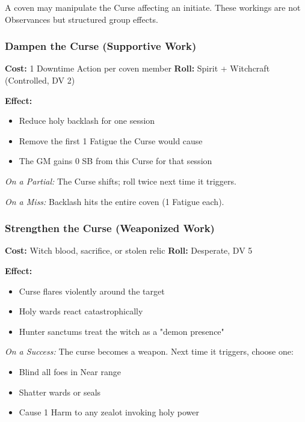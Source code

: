 \documentclass[11pt]{book}
\begin{document}
\begin{tcolorbox}[colback=shadowpurple!5,colframe=shadowpurple!80!black,
title={\textbf{Coven Workings and the Curse of the Unanointed}}]

A coven may manipulate the Curse affecting an initiate.  
These workings are not Observances but structured group effects.

\subsubsection*{Dampen the Curse (Supportive Work)}
\textbf{Cost:} 1 Downtime Action per coven member  
\textbf{Roll:} Spirit + Witchcraft (Controlled, DV 2)

\textbf{Effect:}
\begin{itemize}[leftmargin=1.5em]
    \item Reduce holy backlash for one session
    \item Remove the first 1 Fatigue the Curse would cause
    \item The GM gains 0 SB from this Curse for that session
\end{itemize}

\emph{On a Partial:}  
The Curse shifts; roll twice next time it triggers.

\emph{On a Miss:}  
Backlash hits the entire coven (1 Fatigue each).

\vspace{1em}

\subsubsection*{Strengthen the Curse (Weaponized Work)}
\textbf{Cost:} Witch blood, sacrifice, or stolen relic  
\textbf{Roll:} Desperate, DV 5

\textbf{Effect:}
\begin{itemize}[leftmargin=1.5em]
    \item Curse flares violently around the target
    \item Holy wards react catastrophically
    \item Hunter sanctums treat the witch as a "demon presence"
\end{itemize}

\emph{On a Success:}  
The curse becomes a weapon. Next time it triggers, choose one:
\begin{itemize}
    \item Blind all foes in Near range  
    \item Shatter wards or seals  
    \item Cause 1 Harm to any zealot invoking holy power  
\end{itemize}


\end{tcolorbox}
\end{document}
